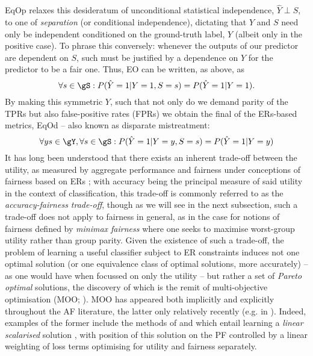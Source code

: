 %
%
\ac{EqOp} relaxes this desideratum of unconditional statistical independence, \(\hat{Y} \perp S\),
to one of \emph{separation} (or conditional independence), dictating that \(\hat{Y}\) and \(S\)
need only be independent conditioned on the ground-truth label, \(Y\) (albeit only in the positive
case).
%
To phrase this conversely: whenever the outputs of our predictor are dependent on \(S\), such must be
justified by a dependence on \(Y\) for the predictor to be a fair one.
%
Thus, EO can be written, as above, as
%
\begin{equation}
    \forall s \in \gS: P( \hat{Y}=1|Y=1, S=s ) = P(\hat{Y}=1|Y=1).
\end{equation}
%
%
By making this symmetric \wrt{} \(Y\), such that not only do we demand parity of the TPRs but also
false-positive rates (FPRs) we obtain the final of the ERs-based metrics, \ac{EqOd}
\citep{hardt2016equality} -- also known as disparate mistreatment:
%
\begin{equation}
    \forall y s \in \gY, \forall s \in \gS: P( \hat{Y}=1|Y=y, S=s ) = P( \hat{Y}=1|Y=y )
\end{equation}
%
%
It has long been understood that there exists an inherent trade-off between the utility, as
measured by aggregate performance and fairness under conceptions of fairness based on ERs
\citep{kaplow1999conflict}; with accuracy being the principal measure of said utility in the
context of classification, this trade-off is commonly referred to as the \emph{accuracy-fairness
trade-off}, though as we will see in the next subsection, such a trade-off does not apply to
fairness in general, as in the case for notions of fairness defined by \emph{minimax fairness}
where one seeks to maximise worst-group utility rather than group parity.
%
Given the existence of such a trade-off, the problem of learning a useful classifier subject to ER
constraints induces not one optimal solution (or one equivalence class of optimal solutions, more
accurately) -- as one would have when focussed on only the utility -- but rather a set of
\emph{Pareto optimal} solutions, the discovery of which is the remit of multi-objective
optimisation (\ac{MOO}; \cite{sawaragi1985theory, deb2013multi}). 
%
MOO has appeared both implicitly and explicitly throughout the \ac{AF} literature, the latter only
relatively recently (e.g. in \cite{navon2020learning}). 
%
Indeed, examples of the former include the methods of \cite{louizos2015variational} and
\cite{madras2018learning} which entail learning a \emph{linear scalarised} solution
\citep{boyd2004convex},  with position of this solution on the \acf{PF} controlled by a linear
weighting of loss terms optimising for utility and fairness separately.
%
